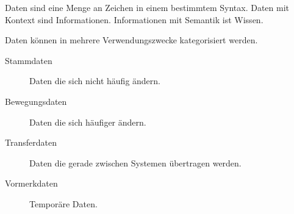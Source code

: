 \documentclass{article}
\begin{document}
 
Daten sind eine Menge an Zeichen in einem bestimmtem Syntax. Daten mit Kontext sind Informationen. Informationen mit Semantik ist Wissen.

Daten können in mehrere Verwendungszwecke kategorisiert werden.
\begin{description}
 \item[Stammdaten] Daten die sich nicht häufig ändern.
 \item[Bewegungsdaten] Daten die sich häufiger ändern.
 \item[Transferdaten] Daten die gerade zwischen Systemen übertragen werden.
 \item[Vormerkdaten] Temporäre Daten.
\end{description}
\end{document}
